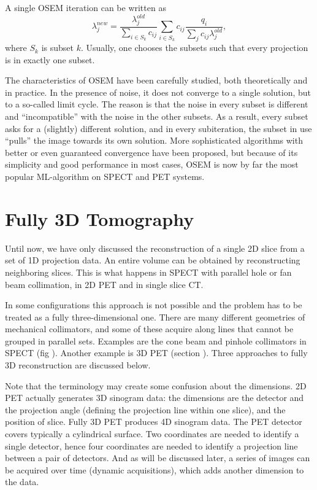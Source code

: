 A single OSEM iteration can be written as
\begin{equation}
  \lambda_j^{new}  =  \frac{\lambda_j^{old}}{\sum_{i\in S_k} c_{ij}}
           \sum_{i\in S_k} c_{ij}  \frac{q_i}{\sum_j c_{ij} \lambda_j^{old}},
           \label{eq:osem}
\end{equation}
where $S_k$ is subset $k$. Usually, one chooses the subsets such that
every projection is in exactly one subset.

The characteristics of OSEM have been carefully studied, both
theoretically and in practice. In the presence of noise, it does not
converge to a single solution, but to a so-called limit cycle. The
reason is that the noise in every subset is different and
``incompatible'' with the noise in the other subsets. As a result,
every subset asks for a (slightly) different solution, and in every
subiteration, the subset in use ``pulls'' the image towards its own
solution. More sophisticated algorithms with better or even guaranteed
convergence have been proposed, but because of its simplicity and good
performance in most cases, OSEM is now by far the most popular
ML-algorithm on SPECT and PET systems.



\section{Fully 3D Tomography}
Until now, we have only discussed the reconstruction of a single 2D slice from
a set of 1D projection data. An entire volume can be obtained by
reconstructing neighboring slices.  This is what happens in SPECT with
parallel hole or fan beam collimation, in 2D PET and in single slice CT.

In some configurations this approach is not possible and the problem
has to be treated as a fully three-dimensional one. There are many
different geometries of mechanical collimators, and some of these
acquire along lines that cannot be grouped in parallel sets. Examples
are the cone beam and pinhole collimators in SPECT (fig
). Another example is 3D PET (section
). Three approaches to fully 3D reconstruction are
discussed below.

Note that the terminology may create some confusion about the
dimensions. 2D PET actually generates 3D sinogram data: the dimensions
are the detector and the projection angle (defining the projection
line within one slice), and the position of slice. Fully 3D PET
produces 4D sinogram data. The PET detector covers typically a
cylindrical surface. Two coordinates are needed to identify a single
detector, hence four coordinates are needed to identify a projection
line between a pair of detectors. And as will be discussed later, a series
of images can be acquired over time (dynamic acquisitions), which adds
another dimension to the data.


